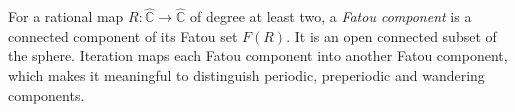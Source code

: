 
For a rational map $R:\widehat{\mathbb C}\to\widehat{\mathbb C}$ of degree at least two, a \emph{Fatou component} is a connected component of its Fatou set $F(R)$. It is an open connected subset of the sphere. Iteration maps each Fatou component into another Fatou component, which makes it meaningful to distinguish periodic, preperiodic and wandering components.
